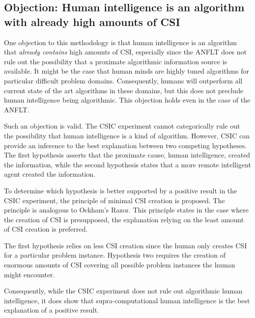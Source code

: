 \subsection{Objection: Human intelligence is an algorithm with already high amounts of CSI}

One objection to this methodology is that human intelligence is an algorithm that \emph{already contains} high amounts of CSI, especially since the ANFLT does not rule out the possibility that a proximate algorithmic information source is available.  It might be the case that human minds are highly tuned algorithms for particular difficult problem domains.  Consequently, humans will outperform all current state of the art algorithms in these domains, but this does not preclude human intelligence being algorithmic.  This objection holds even in the case of the ANFLT.

Such an objection is valid.  The CSIC experiment cannot categorically rule out the possibility that human intelligence is a kind of algorithm.  However, CSIC can provide an inference to the best explanation between two competing hypotheses.  The first hypothesis asserts that the proximate cause, human intelligence, created the information, while the second hypothesis states that a more remote intelligent agent created the information.

To determine which hypothesis is better supported by a positive result in the CSIC experiment, the principle of minimal CSI creation is proposed.  The principle is analogous to Ockham's Razor.  This principle states in the case where the creation of CSI is presupposed, the explanation relying on the least amount of CSI creation is preferred.

The first hypothesis relies on less CSI creation since the human only creates CSI for a particular problem instance.  Hypothesis two requires the creation of enormous amounts of CSI covering all possible problem instances the human might encounter.

 Consequently, while the CSIC experiment does not rule out algorithmic human intelligence, it does show that supra-computational human intelligence is the best explanation of a positive result. 

